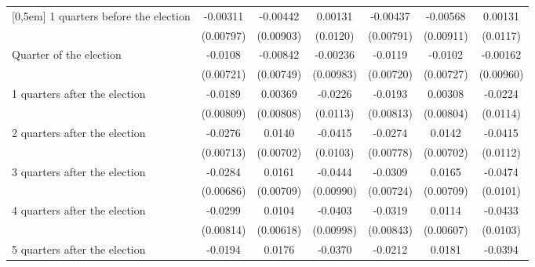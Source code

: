 \begin{table}[!ht]
\begin{tabular}{l*{6}{c}}
[0,5em]
 1 quarters before the election&    -0.00311         &    -0.00442         &     0.00131         &    -0.00437         &    -0.00568         &     0.00131         \\
                    &   (0.00797)         &   (0.00903)         &    (0.0120)         &   (0.00791)         &   (0.00911)         &    (0.0117)         \\
[0,5em]
Quarter of the election&     -0.0108         &    -0.00842         &    -0.00236         &     -0.0119         &     -0.0102         &    -0.00162         \\
                    &   (0.00721)         &   (0.00749)         &   (0.00983)         &   (0.00720)         &   (0.00727)         &   (0.00960)         \\
[0,5em]
 1 quarters after the election&     -0.0189\sym{*}  &     0.00369         &     -0.0226\sym{*}  &     -0.0193\sym{*}  &     0.00308         &     -0.0224\sym{*}  \\
                    &   (0.00809)         &   (0.00808)         &    (0.0113)         &   (0.00813)         &   (0.00804)         &    (0.0114)         \\
[0,5em]
 2 quarters after the election&     -0.0276\sym{***}&      0.0140\sym{*}  &     -0.0415\sym{***}&     -0.0274\sym{***}&      0.0142\sym{*}  &     -0.0415\sym{***}\\
                    &   (0.00713)         &   (0.00702)         &    (0.0103)         &   (0.00778)         &   (0.00702)         &    (0.0112)         \\
[0,5em]
 3 quarters after the election&     -0.0284\sym{***}&      0.0161\sym{*}  &     -0.0444\sym{***}&     -0.0309\sym{***}&      0.0165\sym{*}  &     -0.0474\sym{***}\\
                    &   (0.00686)         &   (0.00709)         &   (0.00990)         &   (0.00724)         &   (0.00709)         &    (0.0101)         \\
[0,5em]
 4 quarters after the election&     -0.0299\sym{***}&      0.0104         &     -0.0403\sym{***}&     -0.0319\sym{***}&      0.0114         &     -0.0433\sym{***}\\
                    &   (0.00814)         &   (0.00618)         &   (0.00998)         &   (0.00843)         &   (0.00607)         &    (0.0103)         \\
[0,5em]
 5 quarters after the election&     -0.0194\sym{**} &      0.0176         &     -0.0370\sym{**} &     -0.0212\sym{**} &      0.0181         &     -0.0394\sym{**} \\

\end{tabular}
\end{table}
